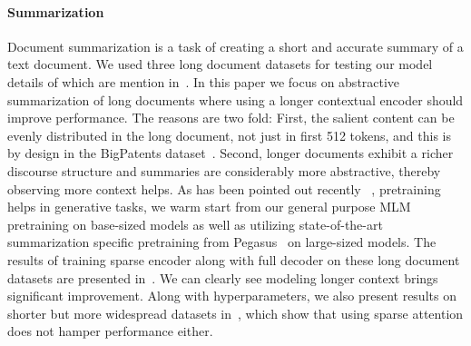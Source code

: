 \paragraph{Summarization}
Document summarization is a task of creating a short and accurate summary of a text document. 
We used three long document datasets for testing our model details of which are mention in~.
In this paper we focus on abstractive summarization of long documents where using a longer contextual encoder should improve performance.
The reasons are two fold:
First, the salient content can be evenly distributed in the long document, not just in first 512 tokens, and this is by design in the BigPatents dataset~\citep{sharma2019bigpatent}.
Second, longer documents exhibit a richer discourse structure and summaries are considerably more abstractive, thereby observing more context helps.
As has been pointed out recently ~\citep{rothe2019leveraging,zhang2019pegasus}, pretraining helps in generative tasks, we warm start from our general purpose MLM pretraining on base-sized models as well as utilizing state-of-the-art summarization specific pretraining from Pegasus~\citep{zhang2019pegasus} on large-sized models.
The results of training \bigb sparse encoder along with full decoder on these long document datasets are presented in~.
We can clearly see modeling longer context brings significant improvement. 
Along with hyperparameters, we also present results on shorter but more widespread datasets in~, which show that using sparse attention does not hamper performance either.

